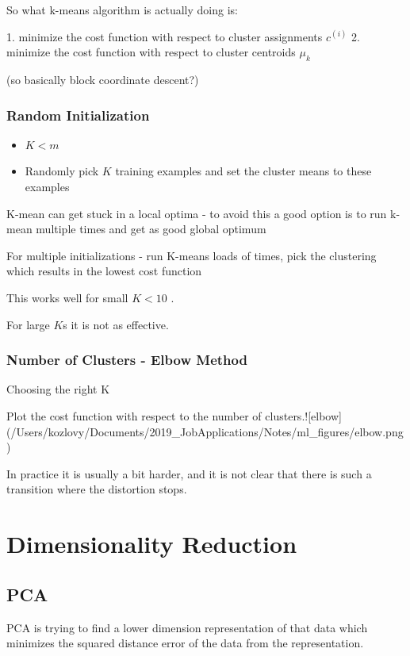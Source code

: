 {{So what k-means algorithm is actually doing is:

1. minimize the cost function with respect to cluster assignments $c^{(i)}$
2. minimize the cost function with respect to cluster centroids $\mu_k$ 

(so basically block coordinate descent?)

\subsubsection{Random Initialization}

\begin{itemize}
\item $K < m$
\item Randomly pick $K$ training examples and set the cluster means to these examples
\end{itemize}

K-mean can get stuck in a local optima - to avoid this a good option is to run k-mean multiple times and get as good global optimum

For multiple initializations - run K-means loads of times, pick the clustering which results in the lowest cost function

This works well for small $K < 10$ .

For large $K$s it is not as effective.

\subsubsection{Number of Clusters - Elbow Method}

Choosing the right K 

Plot the cost function with respect to the number of clusters.![elbow](/Users/kozlovy/Documents/2019_JobApplications/Notes/ml_figures/elbow.png)

In practice it is usually a bit harder, and it is not clear that there is such a transition where the distortion stops.

\section{Dimensionality Reduction}

\subsection{PCA}

PCA is trying to find a lower dimension representation of that data which minimizes the squared distance error of the data from the representation.

}}
